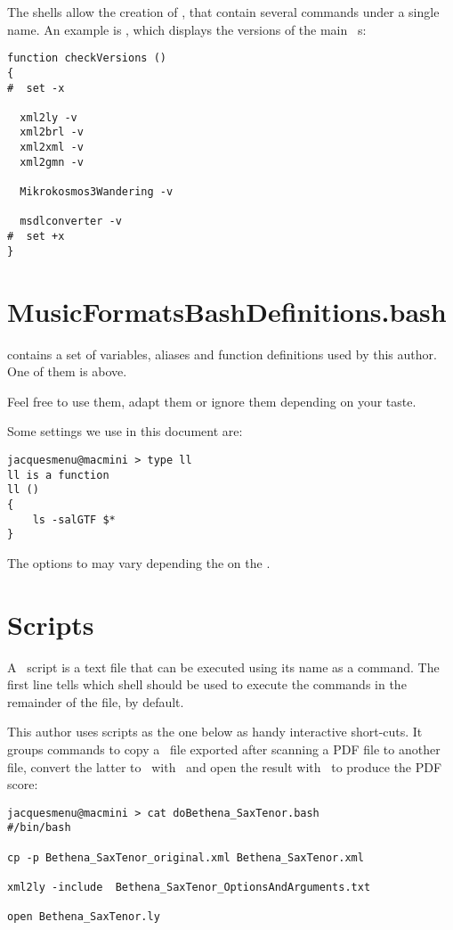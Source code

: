 The shells allow the creation of , that contain several commands under a single name. An example is , which displays the versions of the main \mf\ \service s:
\begin{lstlisting}[language=Terminal]
function checkVersions ()
{
#  set -x

  xml2ly -v
  xml2brl -v
  xml2xml -v
  xml2gmn -v

  Mikrokosmos3Wandering -v

  msdlconverter -v
#  set +x
}
\end{lstlisting}


\section{MusicFormatsBashDefinitions.bash}

 contains a set of variables, aliases and function definitions used by this author. One of them is  above.

Feel free to use them, adapt them or ignore them depending on your taste.

Some settings we use in this document are:
\begin{lstlisting}[language=Terminal]
jacquesmenu@macmini > type ll
ll is a function
ll () 
{ 
    ls -salGTF $*
}
\end{lstlisting}
The options to  may vary depending the on the \OS.

\section{Scripts}

A \shell\ script is a text file that can be executed using its name as a command. The first line tells which shell should be used to execute the commands in the remainder of the file,  by default.

This author uses scripts as the one below as handy interactive short-cuts. It groups commands to copy a \mxml\ file exported after scanning a PDF file to another file, convert the latter to \lily\ with \xmlToLy\ and open the result with \fresco\ to produce the PDF score:
\begin{lstlisting}[language=Terminal]
jacquesmenu@macmini > cat doBethena_SaxTenor.bash 
#/bin/bash

cp -p Bethena_SaxTenor_original.xml Bethena_SaxTenor.xml

xml2ly -include  Bethena_SaxTenor_OptionsAndArguments.txt

open Bethena_SaxTenor.ly
\end{lstlisting}

